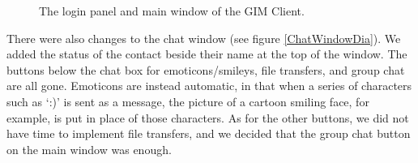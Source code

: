 \begin{figure}
\begin{center}
        \caption{The login panel and main window of the GIM Client.}
        \label{MainWindowDia}
    \end{center}
\end{figure}

There were also changes to the chat window (see figure \ref{ChatWindowDia}). We added the status of the contact beside their name at the top of the window. The buttons below the chat box for emoticons/smileys, file transfers, and group chat are all gone. Emoticons are instead automatic, in that when a series of characters such as `:)' is sent as a message, the picture of a cartoon smiling face, for example, is put in place of those characters. As for the other buttons, we did not have time to implement file transfers, and we decided that the group chat button on the main window was enough.

